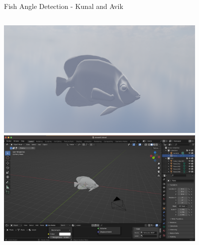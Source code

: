 \begin{frame}{Fish Angle Detection - Kunal and Avik}
    \begin{columns}
        \begin{column}{0.5\textwidth}
            \centering
            \includegraphics[height=0.8\textheight,width=0.8\textwidth,keepaspectratio]{fishImageBlender.png}
            \includegraphics[height=0.8\textheight,width=0.8\textwidth,keepaspectratio]{BlenderGUIScreenshot.png}
        \end{column}
        \begin{column}{0.5\textwidth}
            \centering

\end{column}
\end{columns}
\end{frame}
